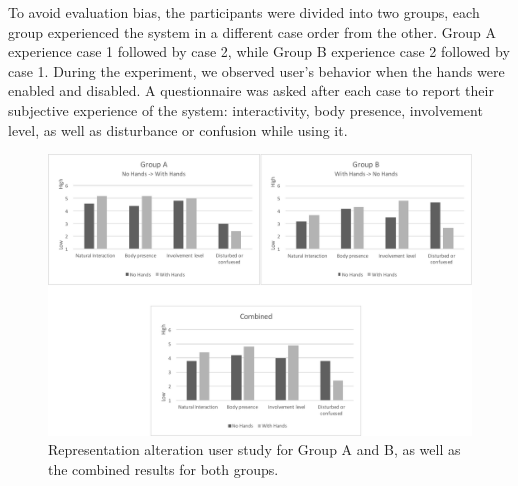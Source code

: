 To avoid evaluation bias, the participants were divided into two groups, each group experienced the system in a different case order from the other. Group A experience case 1 followed by case 2, while Group B experience case 2 followed by case 1. During the experiment, we observed user's behavior when the hands were enabled and disabled. A questionnaire was asked after each case to report their subjective experience of the system: interactivity, body presence, involvement level, as well as disturbance or confusion while using it. 


\begin{figure}[t!]
  \centering
	  \includegraphics[width=1\linewidth]{figures/eval/ET/ResultsCombined.pdf}
  \captionsetup{justification=centering}
  \caption{Representation alteration user study for Group A and B, as well as the combined results for both groups.}
  \label{fig:eval-results}
\end{figure}
